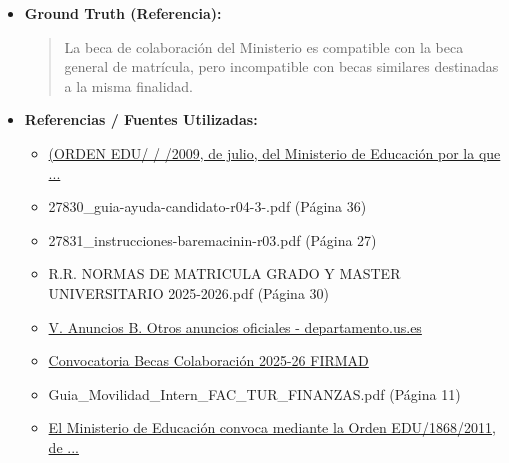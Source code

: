 \documentclass[12pt,a4paper,oneside]{report}
\begin{document}
\begin{itemize}
\begin{itemize}
\begin{quote}
Recuerda que la compatibilidad de becas puede variar dependiendo de las circunstancias individuales y las regulaciones específicas. Es importante consultar con los departamentos correspondientes y revisar la documentación oficial para obtener información precisa y actualizada.
                \end{quote}
          \item \textbf{{Ground Truth (Referencia):}} \\
                \begin{quote}
La beca de colaboración del Ministerio es compatible con la beca general de matrícula, pero incompatible con becas similares destinadas a la misma finalidad.
                \end{quote}
          \item \textbf{{Referencias / Fuentes Utilizadas:}} \\
                \begin{itemize}
                  \item \href{https://departamento.us.es/duot/wp-content/uploads/2025/06/02.-becas-de-colaboracion-2025-2026.pdf}{(ORDEN EDU/ / /2009, de julio, del Ministerio de Educación por la que ...}
                  \item 27830\_guia-ayuda-candidato-r04-3-.pdf (Página 36)
                  \item 27831\_instrucciones-baremacinin-r03.pdf (Página 27)
                  \item R.R. NORMAS DE MATRICULA GRADO Y MASTER UNIVERSITARIO 2025-2026.pdf (Página 30)
                  \item \href{https://departamento.us.es/dbiovege/wp-content/uploads/2025/06/Extracto-Convocatoria-Becas-de-Colaboracion-25-26.pdf}{V. Anuncios B. Otros anuncios oficiales - departamento.us.es}
                  \item \href{https://etsi.us.es/sites/default/files/tablones/Convocatoria\_2025-26.pdf}{Convocatoria Becas Colaboración 2025-26 FIRMAD}
                  \item Guia\_Movilidad\_Intern\_FAC\_TUR\_FINANZAS.pdf (Página 11)
                  \item \href{https://ftf.us.es/sites/ftf/files/Noticias/Resumen+Becas+de+Colaboración+2025-26.pdf}{El Ministerio de Educación convoca mediante la Orden EDU/1868/2011, de ...}
                \end{itemize}
        \end{itemize}


\end{itemize}
\end{document}
